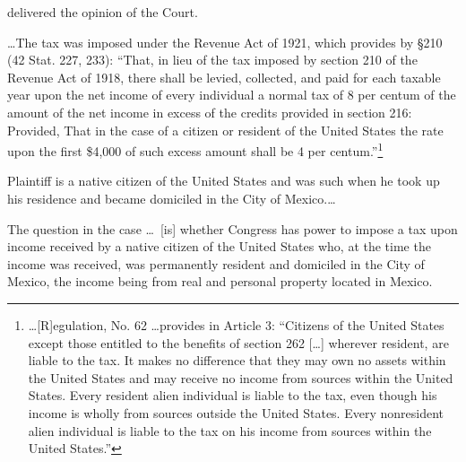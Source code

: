  \begin{select}
 delivered the opinion of the Court.

\ldots The tax was imposed under the Revenue Act of 1921, which provides by \S210 (42 Stat. 227, 233): ``That, in lieu of the tax imposed by section 210 of the Revenue Act of 1918, there shall be levied, collected, and paid for each taxable year upon the net income of every individual a normal tax of 8 per centum of the amount of the net income in excess of the credits provided in section 216: Provided, That in the case of a citizen or resident of the United States the rate upon the first \$4,000 of such excess amount shall be 4 per centum.''\footnote[1]{\ldots [R]egulation, No. 62 \ldots provides in Article 3: ``Citizens of the United States except those entitled to the benefits of section 262 [\ldots] wherever resident, are liable to the tax. It makes no difference that they may own no assets within the United States and may receive no income from sources within the United States. Every resident alien individual is liable to the tax, even though his income is wholly from sources outside the United States. Every nonresident alien individual is liable to the tax on his income from sources within the United States.''} 

Plaintiff is a native citizen of the United States and was such when he took up his residence and became domiciled in the City of Mexico.\ldots\ 

The question in the case \ldots\ [is] whether Congress has power to impose a tax upon income received by a native citizen of the United States who, at the time the income was received, was permanently resident and domiciled in the City of Mexico, the income being from real and personal property located in Mexico.
 

\end{select}
